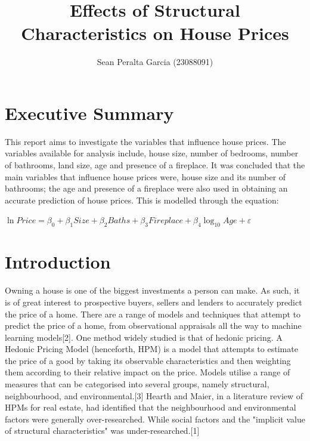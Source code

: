 \documentclass[10pt,A4,makeidx]{article}
\title
{Effects of Structural Characteristics on House Prices}
\author{Sean Peralta Garcia (23088091)}
\date {}
\begin{document}
\maketitle


\section{Executive Summary}
  This report aims to investigate the variables that influence house prices.
  The variables available for analysis include, house size, number of bedrooms,
  number of bathrooms, land size, age and presence of a fireplace. It was concluded that
  the main variables that influence house prices were, house size and its number of bathrooms;
  the age and presence of a fireplace were also used in obtaining an accurate prediction
  of house prices. This is modelled through the equation:
  
  \begin{center}
    \textbf{    \(\ln Price = \beta _0 + \beta _1 Size + \beta _2 Baths + \beta _3 Fireplace + \beta _4 \log_{10}Age + \varepsilon\)\\}
  \end{center}

\section{Introduction}
  Owning a house is one of the biggest investments a person can make. As such, it 
  is of great interest to prospective buyers, sellers and lenders to accurately
  predict the price of a home. There are a range of models and techniques that 
  attempt to predict the price of a home, from observational appraisals all 
  the way to machine learning models[2]. One method widely studied is that of
  hedonic pricing. A Hedonic Pricing Model (henceforth, HPM) is a model that 
  attempts to estimate the price of a good by taking its observable characteristics
  and then weighting them according to their relative impact on the price. Models
  utilise a range of measures that can be categorised into several groups, 
  namely structural, neighbourhood, and environmental.[3] Hearth and Maier,
  in a literature review of HPMs for real estate, had identified that the 
  neighbourhood and environmental factors were generally over-researched. While
  social factors and the "implicit value of structural characteristics" was 
  under-researched.[1]
\end{document}
